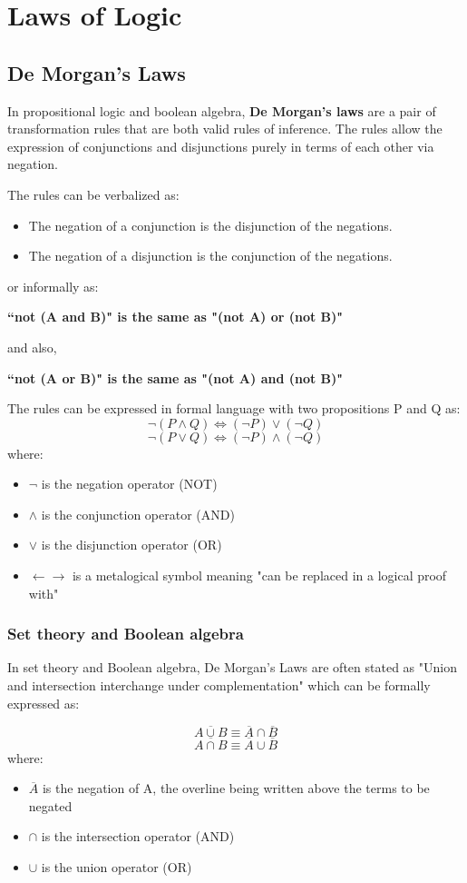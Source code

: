 \documentclass[12pt]{report}
\begin{document}
\section*{Laws of Logic}

\subsection*{De Morgan's Laws}

In propositional logic and boolean algebra, \textbf{De Morgan's laws} are a pair of transformation rules that are both valid rules of inference. The rules allow the expression of conjunctions and disjunctions purely in terms of each other via negation.

\noindent The rules can be verbalized as:

\begin{itemize}
\item The negation of a conjunction is the disjunction of the negations.
\item The negation of a disjunction is the conjunction of the negations.
\end{itemize}
or informally as:
\begin{center}
\textbf{``not (A and B)" is the same as "(not A) or (not B)"
}
\end{center}

and also,
\begin{center}
\textbf{``not (A or B)" is the same as "(not A) and (not B)"
}
\end{center}
The rules can be expressed in formal language with two propositions P and Q as:
\[ \neg(P\land Q)\iff(\neg P)\lor(\neg Q)\]
\[\neg(P\lor Q)\iff(\neg P)\land(\neg Q)\]
where:
\begin{itemize}
\item $\neg$ is the negation operator (NOT)
\item $\wedge $ is the conjunction operator (AND)
\item $\vee$ is the disjunction operator (OR)
\item $\leftarrow \rightarrow$ is a metalogical symbol meaning "can be replaced in a logical proof with"
\end{itemize}

\subsubsection{Set theory and Boolean algebra}
In set theory and Boolean algebra, De Morgan's Laws are often stated as "Union and intersection interchange under complementation" which can be formally expressed as:

\[\overline{A \cup B}\equiv\overline{A} \cap \overline{B}\]
\[\overline{A \cap B}\equiv\overline{A} \cup \overline{B}\]
where:
\begin{itemize}
\item $\overline{A}$ is the negation of A, the overline being written above the terms to be negated
\item $\cap$ is the intersection operator (AND)
\item $\cup$ is the union operator (OR)
\end{itemize}
\end{document}
